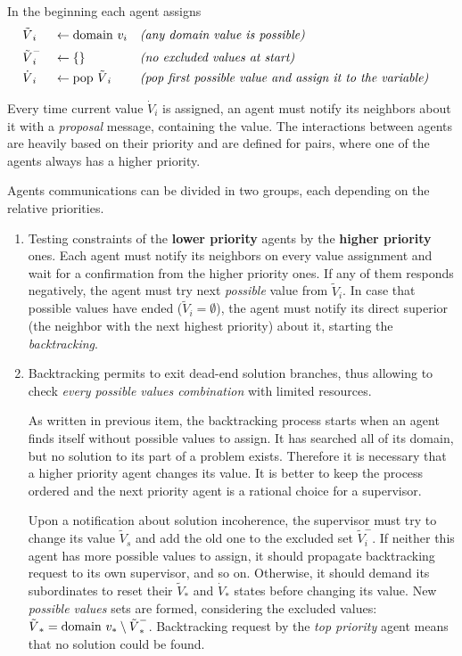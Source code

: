 \noindent
In the beginning each agent assigns
\begin{align*}
  &{\tilde V}_i   &&\leftarrow \mathrm{domain}~v_i       && \textit{(any domain value is possible)} & \\
  &{\tilde V}_i^- &&\leftarrow \{\}              && \textit{(no excluded values at start)}  &\\
  &{\dot V}_i     &&\leftarrow \mathrm{pop}~{\tilde V}_i && \textit{(pop first possible value and assign it to the variable)} &\\
\end{align*}

Every time current value ${\dot V}_i$ is assigned, an agent must notify its
neighbors about it with a \emph{proposal} message, containing the value.
The interactions between agents are heavily based on their priority and are
defined for pairs, where one of the agents always has a higher priority.

Agents communications can be divided in two groups, each depending on the relative
priorities.
\begin{enumerate}
  \item Testing constraints of the \textbf{lower priority} agents by the
    \textbf{higher priority} ones.
    Each agent must notify its neighbors on every value assignment and wait
    for a confirmation from the higher priority ones. If any of them responds
    negatively, the agent must try next \emph{possible} value from ${\tilde V}_i$.
    In case that possible values have ended (${\tilde V}_i = \emptyset$), the agent
    must notify its direct superior (the neighbor with the next highest priority)
    about it, starting the \emph{backtracking}.
  \item Backtracking permits to exit dead-end solution branches, thus allowing
    to check \emph{every possible values combination} with limited resources.

    As written in previous item, the backtracking process starts when an agent
    finds itself without possible values to assign. It has searched all of its
    domain, but no solution to its part of a problem exists. Therefore it is
    necessary that a higher priority agent changes its value. It is better to
    keep the process ordered and the next priority agent is a rational choice
    for a supervisor.

    Upon a notification about solution incoherence, the supervisor
    must try to change its value ${\tilde V}_s$ and add the old one to the
    excluded set ${\tilde V}_i^-$.
    If neither this agent has more possible values to assign, it should propagate
    backtracking request to its own supervisor, and so on. Otherwise, it should
    demand its subordinates to reset their ${\tilde V}_*$ and ${\dot V}_*$ states
    before changing its value. New \emph{possible values} sets are formed, considering
    the excluded values: ${\tilde V}_* = \mathrm{domain}~v_* \setminus {\tilde V}_*^-$.
    Backtracking request by the \emph{top priority} agent means that no solution
    could be found.
\end{enumerate}

